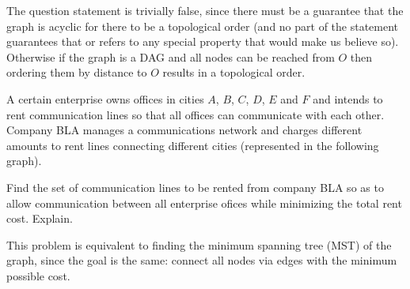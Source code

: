 {The question statement is trivially false, since there must be a guarantee that the graph is acyclic for there to be a topological order (and no part of the statement guarantees that or refers to any special property that would make us believe so). Otherwise if the graph is a DAG and all nodes can be reached from $O$ then ordering them by distance to $O$ results in a topological order.

A certain enterprise owns offices in cities $A$, $B$, $C$, $D$, $E$ and $F$ and intends to rent communication lines so that all offices can communicate with each other. Company BLA manages a communications network and charges different amounts to rent lines connecting different cities (represented in the following graph).

\begin{center}
\end{center}

Find the set of communication lines to be rented from company BLA so as to allow communication between all enterprise ofices while minimizing the total rent cost. Explain.

\ansseparator

This problem is equivalent to finding the minimum spanning tree (MST) of the graph, since the goal is the same: connect all nodes via edges with the minimum possible cost.

}
